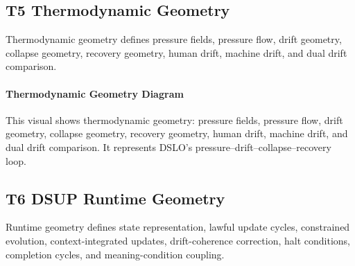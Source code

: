 \subsection{T5 Thermodynamic Geometry}
Thermodynamic geometry defines pressure fields, pressure flow, drift geometry,
collapse geometry, recovery geometry, human drift, machine drift, and dual
drift comparison.

\paragraph{Thermodynamic Geometry Diagram}
This visual shows thermodynamic geometry: pressure fields, pressure flow, drift
geometry, collapse geometry, recovery geometry, human drift, machine drift, and
dual drift comparison. It represents DSLO’s pressure–drift–collapse–recovery
loop.


\begin{center}
\end{center}


\subsection{T6 DSUP Runtime Geometry}
Runtime geometry defines state representation, lawful update cycles, constrained
evolution, context-integrated updates, drift-coherence correction, halt
conditions, completion cycles, and meaning-condition coupling.

